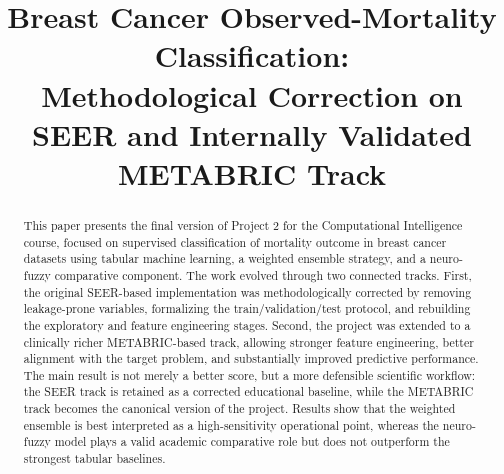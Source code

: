 \documentclass[conference]{IEEEtran}
\begin{document}
\title{Breast Cancer Observed-Mortality Classification:\\
Methodological Correction on SEER and Internally Validated METABRIC Track}

\author{
\and
{}
\and
{}
\and
{}
\and
{}
}

\maketitle

\begin{abstract}
This paper presents the final version of Project 2 for the Computational Intelligence course, focused on supervised classification of mortality outcome in breast cancer datasets using tabular machine learning, a weighted ensemble strategy, and a neuro-fuzzy comparative component. The work evolved through two connected tracks. First, the original SEER-based implementation was methodologically corrected by removing leakage-prone variables, formalizing the train/validation/test protocol, and rebuilding the exploratory and feature engineering stages. Second, the project was extended to a clinically richer METABRIC-based track, allowing stronger feature engineering, better alignment with the target problem, and substantially improved predictive performance. The main result is not merely a better score, but a more defensible scientific workflow: the SEER track is retained as a corrected educational baseline, while the METABRIC track becomes the canonical version of the project. Results show that the weighted ensemble is best interpreted as a high-sensitivity operational point, whereas the neuro-fuzzy model plays a valid academic comparative role but does not outperform the strongest tabular baselines.
\end{abstract}
\end{document}
